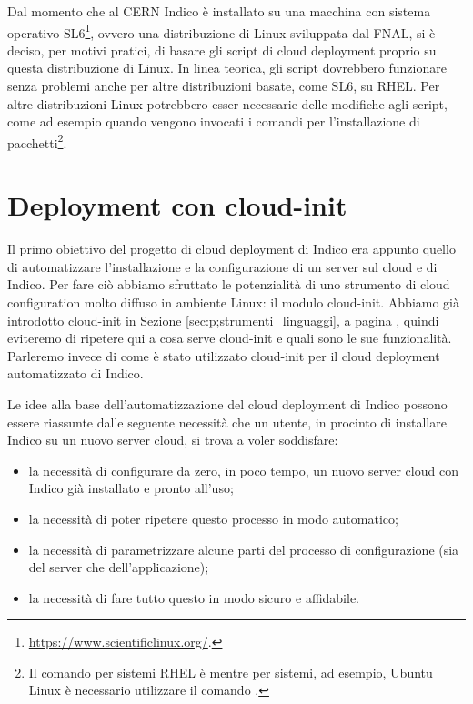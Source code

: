     Dal momento che al \ac{CERN} Indico è installato su una macchina con sistema operativo \ac{SL6}\footnote{\url{https://www.scientificlinux.org/}.}, ovvero una distribuzione di Linux sviluppata dal \ac{FNAL}, si è deciso, per motivi pratici, di basare gli script di cloud deployment proprio su questa distribuzione di Linux. In linea teorica, gli script dovrebbero funzionare senza problemi anche per altre distribuzioni basate, come \ac{SL6}, su \ac{RHEL}. Per altre distribuzioni Linux potrebbero esser necessarie delle modifiche agli script, come ad esempio quando vengono invocati i comandi per l'installazione di pacchetti\footnote{Il comando per sistemi \ac{RHEL} è  mentre per sistemi, ad esempio, Ubuntu Linux è necessario utilizzare il comando .}.

    \section{Deployment con cloud-init} \label{sec:cd;deployment_cloud-init}
    
        Il primo obiettivo del progetto di cloud deployment di Indico era appunto quello di automatizzare l'installazione e la configurazione di un server sul cloud e di Indico. Per fare ciò abbiamo sfruttato le potenzialità di uno strumento di cloud configuration molto diffuso in ambiente Linux: il modulo cloud-init.
        Abbiamo già introdotto cloud-init in Sezione \ref{sec:p;strumenti_linguaggi}, a pagina \pageref{subsec:p;sl;cloud-init}, quindi eviteremo di ripetere qui a cosa serve cloud-init e quali sono le sue funzionalità. Parleremo invece di come è stato utilizzato cloud-init per il cloud deployment automatizzato di Indico.
        
        Le idee alla base dell'automatizzazione del cloud deployment di Indico possono essere riassunte dalle seguente necessità che un utente, in procinto di installare Indico su un nuovo server cloud, si trova a voler soddisfare:
        
        \begin{itemize}
            \item la necessità di configurare da zero, in poco tempo, un nuovo server cloud con Indico già installato e pronto all'uso;
            \item la necessità di poter ripetere questo processo in modo automatico;
            \item la necessità di parametrizzare alcune parti del processo di configurazione (sia del server che dell'applicazione);
            \item la necessità di fare tutto questo in modo sicuro e affidabile.
        \end{itemize}
        
